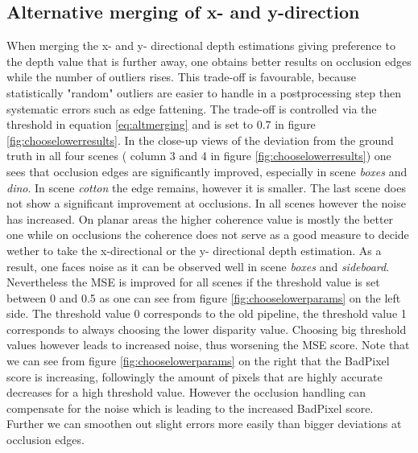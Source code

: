 \documentclass  [
  paper    = a4,
  BCOR     = 10mm,
  twoside,
  fontsize = 12pt,
  fleqn,
  toc      = bibnumbered,
  toc      = listofnumbered,
  numbers  = noendperiod,
  headings = normal,
  listof   = leveldown,
  version  = 3.03
]                                       {scrreprt}
\begin{document}
\subsection{Alternative merging of x- and y-direction}

When merging the x- and y- directional depth estimations giving  preference to the depth value that is further away, one obtains better results on occlusion edges while the number of outliers rises. This trade-off is favourable, because statistically "random" outliers are easier to handle in a postprocessing step then systematic errors such as edge fattening. The trade-off is controlled via the threshold in equation \ref{eq:altmerging} and is set to 0.7 in figure \ref{fig:chooselowerresults}. In the close-up views of the deviation from the ground truth in all four scenes ( column 3 and 4 in figure \ref{fig:chooselowerresults}) one sees that occlusion edges are significantly improved, especially in scene \textit{boxes} and \textit{dino}. In scene \textit{cotton} the edge remains, however it is smaller. The last scene does not show a significant improvement at occlusions. In all scenes however the noise has increased. On planar areas the higher coherence value is mostly the better one while on occlusions the coherence does not serve as a good measure to decide wether to take the x-directional or the y- directional depth estimation. As a result, one faces noise as it can be observed well in scene \textit{boxes} and \textit{sideboard}. \\
Nevertheless the MSE is improved for all scenes if the threshold value is set between 0 and 0.5 as one can see from figure \ref{fig:chooselowerparams} on the left side. The threshold value 0 corresponds to the old pipeline, the threshold value 1 corresponds to always choosing the lower disparity value. Choosing big threshold values however leads to increased noise, thus worsening the MSE score. Note that we can see from figure \ref{fig:chooselowerparams} on the right that the BadPixel score is increasing, followingly the amount of pixels that are highly accurate decreases for a high threshold value. However the occlusion handling can compensate for the noise which is leading to the increased BadPixel score. Further we can smoothen out slight errors more easily than bigger deviations at occlusion edges.\\
\end{document}

